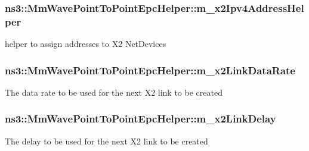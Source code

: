\subsubsection[{\texorpdfstring{m\+\_\+x2\+Ipv4\+Address\+Helper}{m_x2Ipv4AddressHelper}}]{ ns3\+::\+Mm\+Wave\+Point\+To\+Point\+Epc\+Helper\+::m\+\_\+x2\+Ipv4\+Address\+Helper\hspace{0.3cm}{\ttfamily [private]}}\hypertarget{classns3_1_1MmWavePointToPointEpcHelper_ab60ecaf7adee417a4db06a055b0b1e5f}{}\label{classns3_1_1MmWavePointToPointEpcHelper_ab60ecaf7adee417a4db06a055b0b1e5f}
helper to assign addresses to X2 Net\+Devices 
\subsubsection[{\texorpdfstring{m\+\_\+x2\+Link\+Data\+Rate}{m_x2LinkDataRate}}]{ ns3\+::\+Mm\+Wave\+Point\+To\+Point\+Epc\+Helper\+::m\+\_\+x2\+Link\+Data\+Rate\hspace{0.3cm}{\ttfamily [private]}}\hypertarget{classns3_1_1MmWavePointToPointEpcHelper_a00fbca1c04f854302d9ff643b24b7c57}{}\label{classns3_1_1MmWavePointToPointEpcHelper_a00fbca1c04f854302d9ff643b24b7c57}
The data rate to be used for the next X2 link to be created 
\subsubsection[{\texorpdfstring{m\+\_\+x2\+Link\+Delay}{m_x2LinkDelay}}]{ ns3\+::\+Mm\+Wave\+Point\+To\+Point\+Epc\+Helper\+::m\+\_\+x2\+Link\+Delay\hspace{0.3cm}{\ttfamily [private]}}\hypertarget{classns3_1_1MmWavePointToPointEpcHelper_ae014d27a362f6edb9c82405d2fd35e98}{}\label{classns3_1_1MmWavePointToPointEpcHelper_ae014d27a362f6edb9c82405d2fd35e98}
The delay to be used for the next X2 link to be created 
